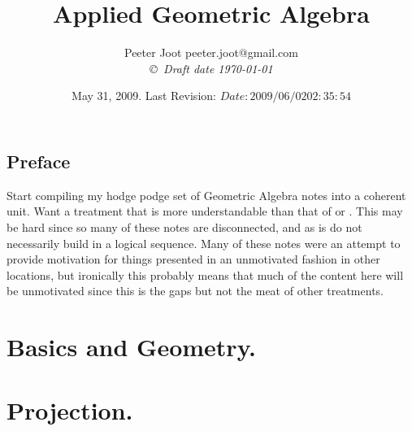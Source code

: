 \documentclass[12pt,leqno]{book}
\title{Applied Geometric Algebra}
\author{Peeter Joot  \quad peeter.joot@gmail.com \\
{\small\em \copyright \  Draft date \today }}
\date{ May 31, 2009.  Last Revision: $Date: 2009/06/02 02:35:54 $ }
\begin{document}
\maketitle
\tableofcontents
\listoffigures
\listoftables
\chapter*{Preface}\normalsize
\pagestyle{plain}

Start compiling my hodge podge set of Geometric Algebra notes into a coherent unit.  Want a treatment that is more
understandable than that of 
\cite{doran2003gap} or 
\cite{hestenes1999nfc}.
This may be hard since so many of these notes are disconnected, and as
is do not necessarily build in a logical sequence.  Many of these 
notes were an attempt to provide motivation for things presented in
an unmotivated fashion in other locations, but ironically this probably
means that much of the content here will be unmotivated since this 
is the gaps but not the meat of other treatments.

%

\pagestyle{headings}


\part{Basics and Geometry.}















\part{Projection.}






\end{document}
